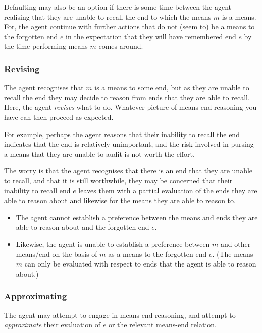 \documentclass[10pt]{article}
\newcommand{\hozlinedash}[0]{%
  \noindent\hdashrule[0.5ex][c]{\textwidth}{.1pt}{2.5pt}
}
\begin{document}
Defaulting may also be an option if there is some time between the agent realising that they are unable to recall the end to which the means \(m\) is a means.
For, the agent continue with further actions that do not (seem to) be a means to the forgotten end \(e\) in the expectation that they will have remembered end \(e\) by the time performing means \(m\) comes around.

\hozlinedash

\subsubsection*{Revising}
\label{sec:revising}

The agent recognises that \(m\) is a means to some end, but as they are unable to recall the end they may decide to reason from ends that they are able to recall.
Here, the agent \emph{revises} what to do.
Whatever picture of means-end reasoning you have can then proceed as expected.

For example, perhaps the agent reasons that their inability to recall the end indicates that the end is relatively unimportant, and the risk involved in pursing a means that they are unable to audit is not worth the effort.

The worry is that the agent recognises that there is an end that they are unable to recall, and that it is still worthwhile, they may be concerned that their inability to recall end \(e\) leaves them with a partial evaluation of the ends they are able to reason about and likewise for the means they are able to reason to.
\begin{itemize}
\item The agent cannot establish a preference between the means and ends they are able to reason about and the forgotten end \(e\).
\item Likewise, the agent is unable to establish a preference between \(m\) and other means/end on the basis of \(m\) as a means to the forgotten end \(e\).
  (The means \(m\) can only be evaluated with respect to ends that the agent is able to reason about.)
\end{itemize}

\hozlinedash

\subsubsection*{Approximating}
\label{sec:approximating}

The agent may attempt to engage in means-end reasoning, and attempt to \emph{approximate} their evaluation of \(e\) or the relevant means-end relation.
\end{document}
